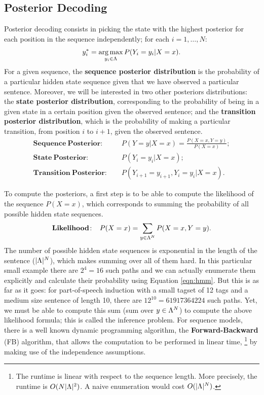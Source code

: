 \subsection{Posterior Decoding}
Posterior decoding consists
in picking the state with the highest posterior for each position in the sequence independently; for
each $i = 1,\ldots,N$:
\begin{equation}
y_i^* = \operatorname*{arg\,max}_{y_i \in \Lambda} P(Y_i=y_i | X = x).
\end{equation}
For a given sequence, the \textbf{sequence posterior distribution} is the probability of a particular
hidden state sequence given that we have observed a particular
sentence. Moreover, we will be interested in two other posteriors distributions:
the \textbf{state posterior distribution}, corresponding to the
probability of being in a given state in a certain position given the
observed sentence; and the \textbf{transition posterior distribution},
which is the probability of making a particular transition, from position $i$ to
$i+1$, given the observed sentence. 
\begin{align}
  \mathbf{Sequence \ Posterior\!:}\;\;\;\; &P(Y=y|X=x) = \frac{P(X=x,Y=y)}{P(X=x)}; \label{eq::posteriorDistribution} \\
 \mathbf{State \ Posterior\!:}\;\;\;\;  & P(Y_i=y_i | X=x); \label{eq::nodePosterior} \\
 \mathbf{Transition \ Posterior\!:}\;\;\;\;  &P(Y_{i+1}=y_{i+1},Y_i=y_i| X=x).\label{eq::edgePosterior}
\end{align}

To compute the posteriors, a first step is to be able to compute the 
likelihood of
the sequence $P(X=x)$, which corresponds to summing the probability of all
possible hidden state sequences.
\begin{equation}
\label{likelihoood}
\mathbf{Likelihood\!:}\;\;\;\; P(X=x) = \displaystyle \sum_{y \in \Lambda^N} P(X=x,Y=y).
\end{equation}
The number of possible hidden state sequences is exponential in the
length of the sentence ($|\Lambda|^N$),
 which makes summing over all of them hard. In this particular small
 example there are $2^4 = 16$ such paths and we can actually enumerate
 them explicitly and calculate their probability using Equation \ref{eqn:hmm}. But this is as far as it goes: for part-of-speech
 induction with a small tagset of 12 tags and a medium size
 sentence of length 10, there are $12^{10} = 61 917 364 224$ such
 paths. 
Yet, we must be able to compute this sum (sum over $y \in \Lambda^N$) to compute the above likelihood
formula; this is called the inference problem. For sequence models, there is a well known dynamic programming algorithm,
the \textbf{Forward-Backward} (FB) algorithm, that allows the computation
to be performed in linear time,%
\footnote{The runtime is linear with respect
to the sequence length. More precisely, 
the runtime is $O(N|\Lambda|^2)$. 
A naive enumeration would cost $O(|\Lambda|^N)$.} %
by making use of the independence assumptions.


